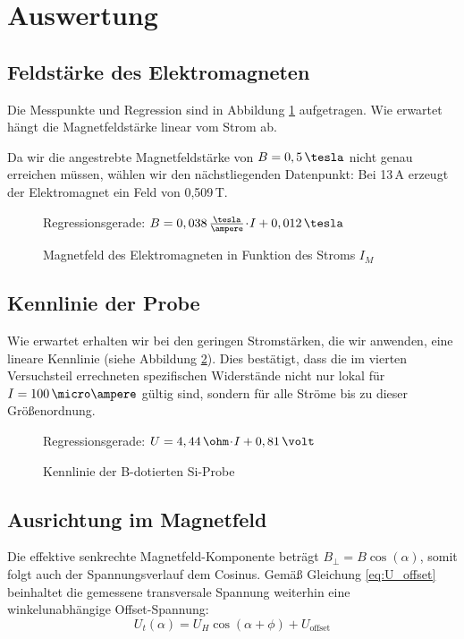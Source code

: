 \newpage
\section{Auswertung}

\subsection{Feldstärke des Elektromagneten}
Die Messpunkte und Regression sind in Abbildung \ref{fig:plot_B} aufgetragen. Wie erwartet hängt die Magnetfeldstärke linear vom Strom ab.

Da wir die angestrebte Magnetfeldstärke von $B = 0,5 \,\tesla$ nicht genau erreichen müssen, wählen wir den nächstliegenden Datenpunkt: Bei 13\,A erzeugt der Elektromagnet ein Feld von 0,509\,T.

\begin{figure}[p]
\centering

\caption{Magnetfeld des Elektromagneten in Funktion des Stroms $I_M$}
\label{fig:plot_B}
\vspace{-0.5ex}
Regressionsgerade: $B = 0,038 \,\frac{\tesla}{\ampere}  \cdt  I  +  0,012\,\tesla$
\end{figure}

\subsection{Kennlinie der Probe}
Wie erwartet erhalten wir bei den geringen Stromstärken, die wir anwenden, eine lineare Kennlinie (siehe Abbildung \ref{fig:plot_Kenn}). Dies bestätigt, dass die im vierten Versuchsteil errechneten spezifischen Widerstände nicht nur lokal für $I = 100\,\micro\ampere$ gültig sind, sondern für alle Ströme bis zu dieser Größenordnung.

\begin{figure}[p]
\centering

\caption{Kennlinie der \textsf{B}-dotierten \textsf{Si}-Probe}
\label{fig:plot_Kenn}
\vspace{-0.5ex}
Regressionsgerade: $U = 4,44\,\ohm \cdt  I  +  0,81\,\volt$
\end{figure}

\subsection{Ausrichtung im Magnetfeld}
Die effektive senkrechte Magnetfeld-Komponente beträgt $B_\perp = B \cos (\alpha)$, somit folgt auch der Spannungsverlauf dem Cosinus. Gemäß Gleichung \eqref{eq:U_offset} beinhaltet die gemessene transversale Spannung weiterhin eine winkelunabhängige Offset-Spannung:
\begin{equation}
U_t(\alpha) = U_H \cos (\alpha + \phi) + U_\text{offset}
\end{equation}

